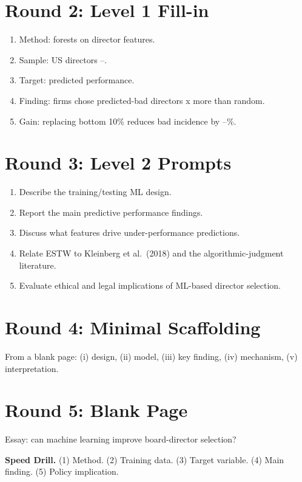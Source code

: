 \documentclass[11pt]{article}
\newcommand{\blank}[1]{\underline{\hspace{#1}}}
\begin{document}
\section*{Round 2: Level 1 Fill-in}
\begin{enumerate}
\item Method: \blank{2cm} forests on director features.
\item Sample: US directors \blank{1cm}--\blank{1cm}.
\item Target: predicted \blank{2cm} performance.
\item Finding: firms chose predicted-bad directors \blank{1cm}x more than random.
\item Gain: replacing bottom 10\% reduces bad incidence by \blank{1cm}--\blank{1cm}\%.
\end{enumerate}

\section*{Round 3: Level 2 Prompts}
\begin{enumerate}
\item Describe the training/testing ML design.
\item Report the main predictive performance findings.
\item Discuss what features drive under-performance predictions.
\item Relate ESTW to Kleinberg et al.\ (2018) and the algorithmic-judgment literature.
\item Evaluate ethical and legal implications of ML-based director selection.
\end{enumerate}

\section*{Round 4: Minimal Scaffolding}
From a blank page: (i) design, (ii) model, (iii) key finding, (iv) mechanism, (v) interpretation.

\section*{Round 5: Blank Page}
Essay: can machine learning improve board-director selection?

\vspace{6pt}
\begin{drillbox}
\textbf{Speed Drill.} (1) Method. (2) Training data. (3) Target variable. (4) Main finding. (5) Policy implication.
\end{drillbox}
\end{document}

